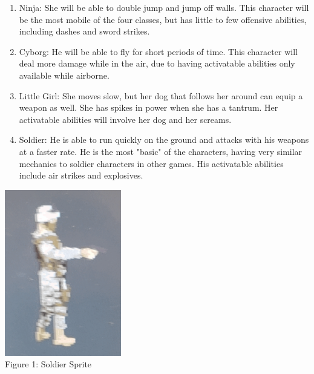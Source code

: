 \documentclass{article}
\begin{document}
\begin{enumerate}
    

\item Ninja: She will be able to double jump and jump off walls. This character will be the most mobile of the four classes, but has little to few offensive abilities, including dashes and sword strikes.


\item Cyborg: He will be able to fly for short periods of time. This character will deal more damage while in the air, due to having activatable abilities only available while airborne.
    

\item Little Girl: She moves slow, but her dog that follows her around can equip a weapon as well. She has spikes in power when she has a tantrum. Her activatable abilities will involve her dog and her screams.
    

\item Soldier: He is able to run quickly on the ground and attacks with his weapons at a faster rate. He is the most "basic" of the characters, having very similar mechanics to soldier characters in other games. His activatable abilities include air strikes and explosives.

\end{enumerate}

\begin{center}
    \includegraphics[width = 2in]{solider.PNG}\\
    Figure 1: Soldier Sprite
\end{center}
    
\end{document}
